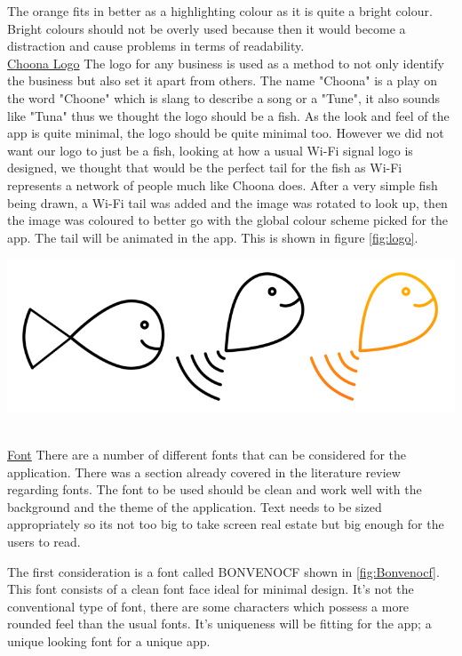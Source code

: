 The orange fits in better as a highlighting colour as it is quite a bright colour. Bright colours should not be overly used because then it would become a distraction and cause problems in terms of readability.  \\

\noindent\underline{Choona Logo}\newline
The logo for any business is used as a method to not only identify the business but also set it apart from others. The name "Choona" is a play on the word "Choone" which is slang to describe a song or a "Tune", it also sounds like "Tuna" thus we thought the logo should be a fish. As the look and feel of the app is quite minimal, the logo should be quite minimal too. However we did not want our logo to just be a fish, looking at how a usual Wi-Fi signal logo is designed, we thought that would be the perfect tail for the fish as Wi-Fi represents a network of people much like Choona does. After a very simple fish being drawn, a Wi-Fi tail was added and the image was rotated to look up, then the image was coloured to better go with the global colour scheme picked for the app. The tail will be animated in the app. This is shown in figure \ref{fig:logo}.

\begin{minipage}{\linewidth}
\centering
\includegraphics[scale=0.5]{./img/logothinking.png}
\label{fig:logo}
\end{minipage}\\


\noindent\underline{Font}\newline
There are a number of different fonts that can be considered for the application. There was a section already covered in the literature review regarding fonts. The font to be used should be clean and work well with the background and the theme of the application. Text needs to be sized appropriately so its not too big to take screen real estate but big enough for the users to read.

The first consideration is a font called BONVENOCF shown in \ref{fig:Bonvenocf}. This font consists of a clean font face ideal for minimal design. It's not the conventional type of font, there are some characters which possess a more rounded feel than the usual fonts. It's uniqueness will be fitting for the app; a unique looking font for a unique app. 

